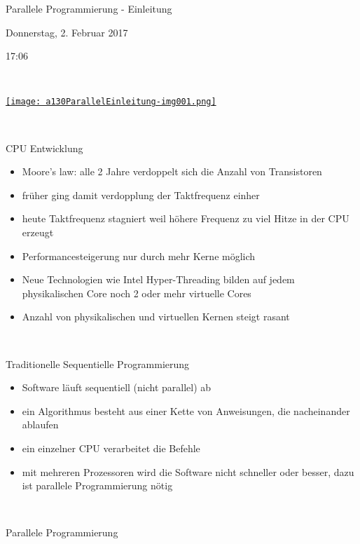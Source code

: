 Parallele Programmierung - Einleitung

Donnerstag, 2. Februar 2017

17:06

~

\href{https://www.google.de/url?sa=i&rct=j&q=&esrc=s&source=images&cd=&ved=0ahUKEwibrNLm0oXSAhVHkRQKHYuFDUYQjRwIBw&url=https%3A%2F%2Fwww.karlrupp.net%2F2015%2F06%2F40-years-of-microprocessor-trend-data%2F&bvm=bv.146496531,d.d24&psig=AFQjCNFaA57rF0uDvjQsXBVqwea_SudE3w&ust=1486820116391051&cad=rjt}{ \texttt{[image: a130ParallelEinleitung-img001.png]} }

~

CPU Entwicklung

\begin{itemize}
\item Moore's law: alle 2 Jahre verdoppelt sich die Anzahl von Transistoren
\item früher ging damit verdopplung der Taktfrequenz einher
\item heute Taktfrequenz stagniert weil höhere Frequenz zu viel Hitze in der CPU erzeugt
\item Performancesteigerung nur durch mehr Kerne möglich
\item Neue Technologien wie Intel Hyper-Threading bilden auf jedem physikalischen Core noch 2 oder mehr virtuelle Cores
\item Anzahl von physikalischen und virtuellen Kernen steigt rasant
\end{itemize}
~

Traditionelle Sequentielle Programmierung

\begin{itemize}
\item Software läuft sequentiell (nicht parallel) ab
\item ein Algorithmus besteht aus einer Kette von Anweisungen, die nacheinander ablaufen
\item ein einzelner CPU verarbeitet die Befehle
\item mit mehreren Prozessoren wird die Software nicht schneller oder besser, dazu ist parallele Programmierung nötig
\end{itemize}
~

Parallele Programmierung

